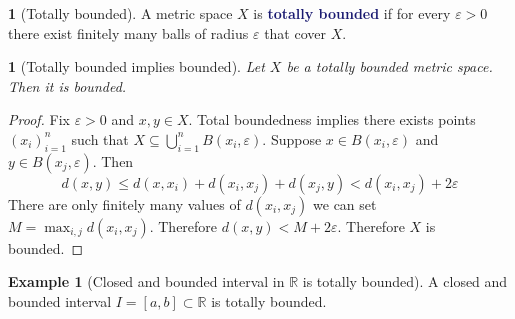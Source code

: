 \documentclass[12pt]{article}
\numberwithin{equation}{section}
\newcommand{\navy}[1]{\textcolor{MidnightBlue}{\bf #1}}
\theoremstyle{plain}
\newtheorem{claim}{\color{ForestGreen}{\textbf{Claim}}}[section]
\theoremstyle{definition}
\newtheorem{definition}{\color{MidnightBlue}{\textbf{Definition}}}[section]
\newtheorem{example}{\color{WildStrawberry}Example}[section]
\newcommand{\1}{\mathbbm 1}
\newcommand{\e}{\varepsilon}
\newcommand{\RR}{\mathbb R}
\begin{document}
\begin{definition}[Totally bounded]
	A metric space $X$ is \navy{totally bounded} if for every $\e > 0$ there exist finitely many balls of radius $\e$ that cover $X$. 
\end{definition}

\begin{claim}[Totally bounded implies bounded]
	Let $X$ be a totally bounded metric space. Then it is bounded. 
\end{claim}
\begin{proof}
	Fix $\e > 0$ and $x,y \in X$. Total boundedness implies there exists points $(x_i)_{i=1}^n$ such that $X \subseteq \bigcup_{i=1}^n B(x_i, \e)$. Suppose $x \in B(x_i,\e)$ and $y \in B(x_j,\e)$. Then 
	\begin{equation}
	 	d(x,y) \leq d(x,x_i) + d(x_i, x_j) + d(x_j,y) < d(x_i, x_j) + 2\e
	 \end{equation} 
	 There are only finitely many values of $d(x_i, x_j)$ we can set $M = \max_{i,j} d(x_i, x_j)$. Therefore $d(x,y) < M + 2\e$. Therefore $X$ is bounded. 
\end{proof}


\begin{example}[Closed and bounded interval in $\RR$ is totally bounded]
	A closed and bounded interval $I = [a,b] \subset \RR$ is totally bounded. 
\end{example}
\end{document}

